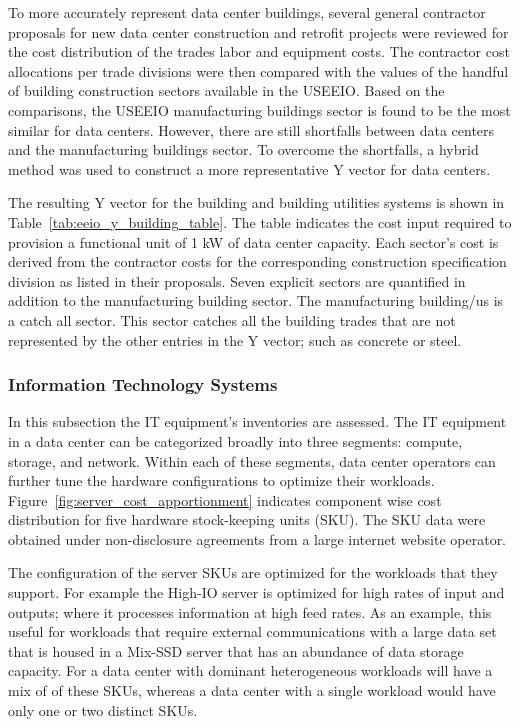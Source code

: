         To more accurately represent data center buildings, several general contractor proposals for new data center construction and retrofit projects were reviewed for the cost distribution of the trades labor and equipment costs.  The contractor cost allocations per trade divisions were then compared with the values of the handful of building construction sectors available in the USEEIO. Based on the comparisons, the USEEIO manufacturing buildings sector is found to be the most similar for data centers. However, there are still shortfalls between data centers and the manufacturing buildings sector. To overcome the shortfalls, a hybrid method was used to construct a more representative Y vector for data centers. 
        
        The resulting Y vector for the building and building utilities systems is shown in Table~\ref{tab:eeio_y_building_table}. The table indicates the cost input required to provision a functional unit of 1 kW of data center capacity. Each sector's cost is derived from the contractor costs for the corresponding construction specification division as listed  in their proposals. Seven explicit sectors are quantified in addition to the manufacturing building sector. The manufacturing building/us is a catch all sector. This sector catches all the building trades that are not represented by the other entries in the Y vector; such as concrete or steel. 
        
        
        
        \subsubsection{Information Technology Systems}
        
        In this subsection the IT equipment's inventories are assessed. The IT equipment in a data center can be categorized broadly into three segments: compute, storage, and network. Within each of these segments, data center operators can further tune the hardware configurations to optimize their workloads. Figure~\ref{fig:server_cost_apportionment} indicates component wise cost distribution for five hardware stock-keeping units (SKU). The SKU data were obtained under non-disclosure agreements from a large internet website operator.  
        
        
        
        The configuration of the server SKUs are optimized for the workloads that they support. For example the High-IO server is optimized for high rates of input and outputs; where it processes information at high feed rates. As an example, this useful for workloads that require external communications with a large data set that is housed in a Mix-SSD server that has an abundance of data storage capacity. For a data center with dominant heterogeneous workloads will have a mix of of these SKUs, whereas a data center with a single workload would have only one or two distinct SKUs.
        
